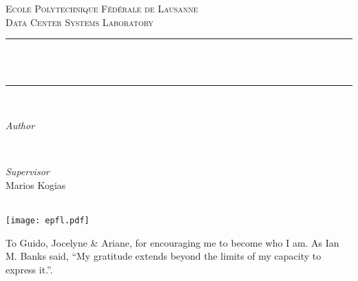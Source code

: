 \makeatletter
{}
\begin{titlepage}
	\newcommand{\HRule}{\rule{\linewidth}{0.5mm}}

	\center


	\textsc{\LARGE Ecole Polytechnique Fédérale de Lausanne}\\[1cm]

	\textsc{\Large Data Center Systems Laboratory}\\[0.5cm]


	\HRule\\[0.4cm]

	{\huge\bfseries \@title}\\[0.4cm]

	\HRule\\[1.5cm]


	\begin{minipage}{0.4\textwidth}
		\begin{flushleft}
			\large
			\textit{Author}\\
			\@author
		\end{flushleft}
	\end{minipage}
	~
	\begin{minipage}{0.4\textwidth}
		\begin{flushright}
			\large
			\textit{Supervisor}\\
			Marios Kogias
		\end{flushright}
	\end{minipage}

    \vfill

    {\large\@date}\\

	\texttt{[image: epfl.pdf]}
\end{titlepage}
\restoregeometry
\cleardoublepage

\hspace{0pt}
\vfill

\begin{dedication}
    To Guido, Jocelyne \& Ariane, for encouraging me to become who I am.
    As Ian M. Banks said, ``My gratitude extends beyond the limits of my capacity to express it.''.
\end{dedication}
\vfill

\clearpage
